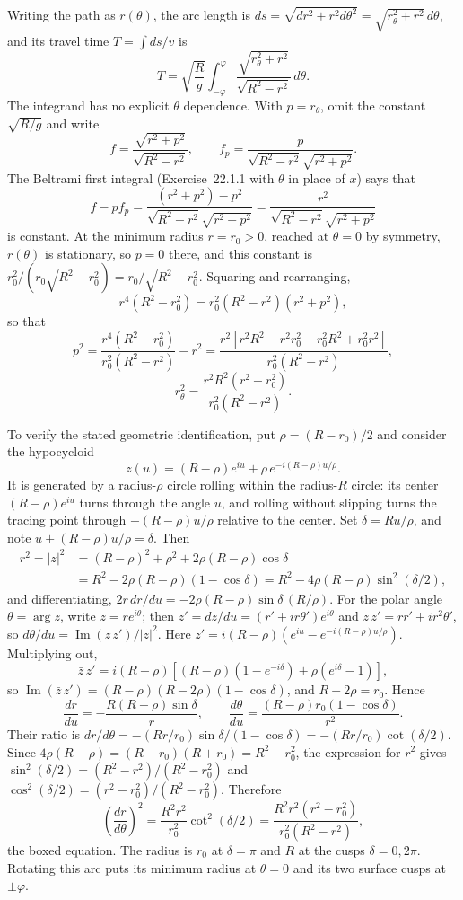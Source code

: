 Writing the path as $r(\theta)$, the arc length is
$ds=\sqrt{dr^2+r^2d\theta^2}=\sqrt{r_\theta^2+r^2}\,d\theta$, and its
travel time $T=\int ds/v$ is
\[
T=\sqrt{\frac Rg}\int_{-\varphi}^{\varphi}
\frac{\sqrt{r_\theta^2+r^2}}{\sqrt{R^2-r^2}}\,d\theta.
\]
The integrand has no explicit $\theta$ dependence. With
$p=r_\theta$, omit the constant $\sqrt{R/g}$ and write
\[
f=\frac{\sqrt{r^2+p^2}}{\sqrt{R^2-r^2}},\qquad
f_p=\frac{p}{\sqrt{R^2-r^2}\sqrt{r^2+p^2}}.
\]
The Beltrami first integral
(Exercise~22.1.1 with $\theta$ in place of $x$) says that
\[
f-pf_p=\frac{(r^2+p^2)-p^2}
{\sqrt{R^2-r^2}\sqrt{r^2+p^2}}
=\frac{r^2}
{\sqrt{R^2-r^2}\sqrt{r^2+p^2}}
\]
is constant. At the minimum radius $r=r_0>0$, reached at $\theta=0$ by
symmetry, $r(\theta)$ is stationary, so $p=0$ there, and this
constant is $r_0^2/(r_0\sqrt{R^2-r_0^2})=r_0/\sqrt{R^2-r_0^2}$.
Squaring and rearranging,
\[
r^4(R^2-r_0^2)=r_0^2(R^2-r^2)(r^2+p^2),
\]
so that
\[
p^2=\frac{r^4(R^2-r_0^2)}{r_0^2(R^2-r^2)}-r^2
=\frac{r^2[r^2R^2-r^2r_0^2-r_0^2R^2+r_0^2r^2]}{r_0^2(R^2-r^2)},
\]
\[
\boxed{r_\theta^2=
\frac{r^2R^2(r^2-r_0^2)}{r_0^2(R^2-r^2)}}.
\]

To verify the stated geometric identification, put
$\rho=(R-r_0)/2$ and consider the hypocycloid
\[
z(u)=(R-\rho)e^{iu}+\rho\,e^{-i(R-\rho)u/\rho}.
\]
It is generated by a radius-$\rho$ circle rolling within the
radius-$R$ circle: its center $(R-\rho)e^{iu}$ turns through the angle $u$,
and rolling without slipping turns the tracing point through
$-(R-\rho)u/\rho$ relative to the center. Set $\delta=Ru/\rho$, and note
$u+(R-\rho)u/\rho=\delta$. Then
\[
\begin{aligned}
r^2=|z|^2&=(R-\rho)^2+\rho^2+2\rho(R-\rho)\cos\delta\\
&=R^2-2\rho(R-\rho)(1-\cos\delta)=R^2-4\rho(R-\rho)\sin^2(\delta/2),
\end{aligned}
\]
and differentiating, $2r\,dr/du=-2\rho(R-\rho)\sin\delta\,(R/\rho)$. For the
polar angle $\theta=\arg z$, write $z=re^{i\theta}$; then
$z'=dz/du=(r'+ir\theta')e^{i\theta}$ and $\bar z\,z'=rr'+ir^2\theta'$, so
$d\theta/du=\operatorname{Im}(\bar z\,z')/|z|^2$. Here
$z'=i(R-\rho)(e^{iu}-e^{-i(R-\rho)u/\rho})$. Multiplying out,
\[
\bar z\,z'=i(R-\rho)\left[(R-\rho)(1-e^{-i\delta})+\rho(e^{i\delta}-1)\right],
\]
so $\operatorname{Im}(\bar z\,z')=(R-\rho)(R-2\rho)(1-\cos\delta)$, and
$R-2\rho=r_0$. Hence
\[
\frac{dr}{du}=-\frac{R(R-\rho)\sin\delta}{r},\qquad
\frac{d\theta}{du}
=\frac{(R-\rho)r_0(1-\cos\delta)}{r^2}.
\]
Their ratio is
$dr/d\theta=-(Rr/r_0)\sin\delta/(1-\cos\delta)=-(Rr/r_0)\cot(\delta/2)$.
Since $4\rho(R-\rho)=(R-r_0)(R+r_0)=R^2-r_0^2$, the expression for $r^2$
gives $\sin^2(\delta/2)=(R^2-r^2)/(R^2-r_0^2)$ and
$\cos^2(\delta/2)=(r^2-r_0^2)/(R^2-r_0^2)$. Therefore
\[
\left(\frac{dr}{d\theta}\right)^2
=\frac{R^2r^2}{r_0^2}\cot^2(\delta/2)
=\frac{R^2r^2(r^2-r_0^2)}
{r_0^2(R^2-r^2)},
\]
the boxed equation. The radius is $r_0$ at $\delta=\pi$ and $R$ at the
cusps $\delta=0,2\pi$. Rotating this arc puts its minimum
radius at $\theta=0$ and its two surface cusps at $\pm\varphi$.

